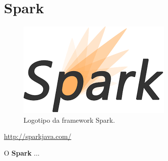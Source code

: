 \section{Spark}
\label{subsec:spark}

\begin{figure}[H]
    \centering
    \includegraphics[scale=0.3]{images/spark.png}
    \caption{Logotipo da framework Spark.}
    \label{fig:spark}
\end{figure}

\href{http://sparkjava.com/}{http://sparkjava.com/}

\hspace{5mm} O \textbf{Spark} ...